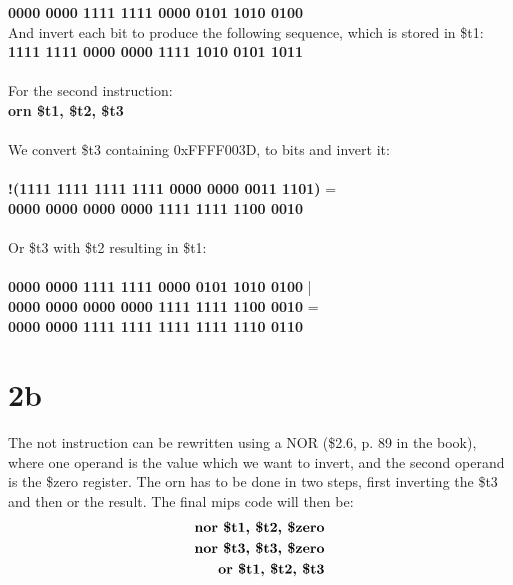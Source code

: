 \documentclass[10pt,a4paper]{article}
\begin{document}
\noindent	\textbf{0000 0000 1111 1111 0000 0101 1010 0100} \\
	
\noindent And invert each bit to produce the following sequence,
which is stored in \$t1: \\
	
\noindent	\textbf{1111 1111 0000 0000 1111 1010 0101 1011} \\\\

\noindent For the second instruction: \\

\noindent \textbf{orn \$t1, \$t2, \$t3} \\\\
\noindent We convert \$t3 containing 0xFFFF003D, to bits and invert it:\\\\
\noindent \textbf{!(1111 1111 1111 1111 0000 0000 0011 1101)} =   \\
\noindent \textbf{0000 0000 0000 0000 1111 1111 1100 0010} \\\\
\noindent Or \$t3 with \$t2 resulting in \$t1: \\\\
\noindent \textbf{0000 0000 1111 1111 0000 0101 1010 0100} | \\
\noindent \textbf{0000 0000 0000 0000 1111 1111 1100 0010} = \\
\noindent \textbf{0000 0000 1111 1111 1111 1111 1110 0110}
\section*{2b}
The not instruction can be rewritten using a NOR (\$2.6, p. 89 in the book), where one operand is the value which we want to invert, and the second operand is the \$zero register. The orn has to be done in two steps, first inverting the \$t3 and then or the result. The final mips code will then be:\\
\begin{eqnarray}
\noindent \textbf{nor \$t1, \$t2, \$zero} \\
\noindent \textbf{nor \$t3, \$t3, \$zero} \\
\noindent \textbf{or  \$t1, \$t2, \$t3} 
\end{eqnarray}
\end{document}
